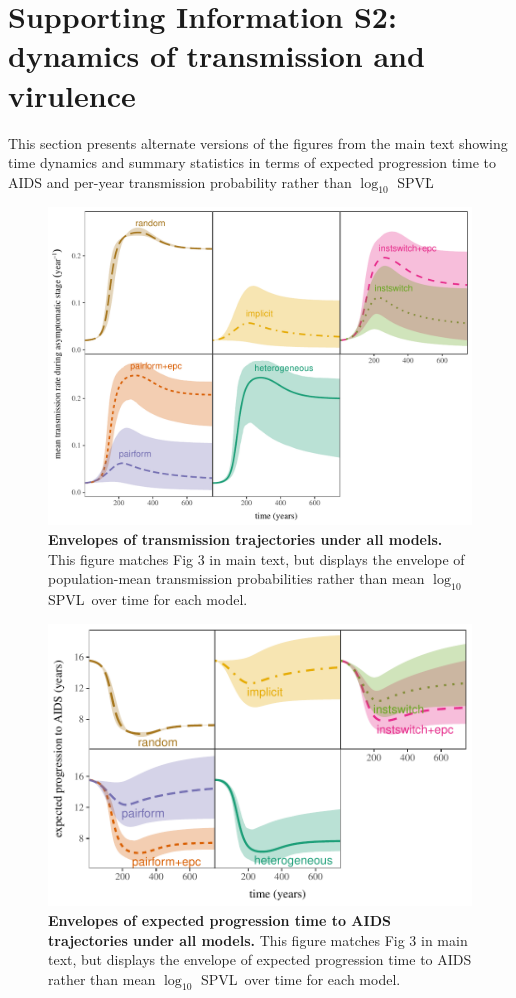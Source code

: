 \documentclass[10pt,letterpaper]{article}
\date{}
\newcommand{\Lspvl}{$\log_{10}$ SPVL}
\begin{document}
\section*{Supporting Information S2: dynamics of transmission and virulence}

This section presents alternate versions of
the figures from the main text showing time dynamics and summary
statistics in terms of expected progression time to AIDS and per-year transmission probability
rather than \Lspvl\.

\begin{figure}[!ht]
\includegraphics[width=\textwidth]{../figures/fig_S2_1.pdf}
\caption{{\bf Envelopes of transmission trajectories under all models.}
This figure matches Fig 3 in main text, but displays the
envelope of population-mean transmission probabilities rather than mean \Lspvl\ over time
for each model.
}
\label{fig:transtraj}
\end{figure}

\clearpage

\begin{figure}[!ht]
\includegraphics[width=\textwidth]{../figures/fig_S2_2.pdf}
\caption{{\bf Envelopes of expected progression time to AIDS trajectories under all models.}
This figure matches Fig 3 in main text, but displays the
envelope of expected progression time to AIDS rather than mean \Lspvl\ over time
for each model.
}
\label{fig:durtraj}
\end{figure}
\end{document}
